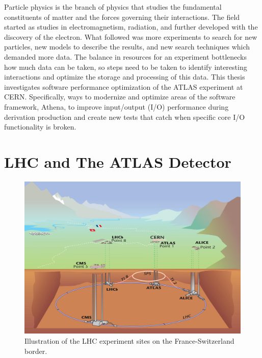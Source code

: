 Particle physics is the branch of physics that studies the fundamental constituents of matter and the forces governing their interactions.  
The field started as studies in electromagnetism, radiation, and further developed with the discovery of the electron.
What followed was more experiments to search for new particles, new models to describe the results, and new search techniques which demanded more data.
The balance in resources for an experiment bottlenecks how much data can be taken, so steps need to be taken to identify interesting interactions and optimize the storage and processing of this data.
This thesis investigates software performance optimization of the ATLAS experiment at CERN. 
Specifically, ways to modernize and optimize areas of the software framework, Athena, to improve input/output (I/O) performance during derivation production and create new tests that catch when specific core I/O functionality is broken.

\section{LHC and The ATLAS Detector}

\begin{figure}[h]
    \centering
    \includegraphics[width=.8\textwidth]{content/img/LHC illustration.jpg}
    \caption{Illustration of the LHC experiment sites on the France-Switzerland border.\cite{LHC_Illustration}}
    \label{fig:intro_LHC_sites}
\end{figure}

